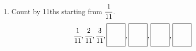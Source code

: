 \documentclass[12pt,letterpaper]{article}
\begin{document}
\begin{large}
\begin{enumerate}
\pagebreak

\item Count by 11ths starting from $\cfrac{1}{11}$.
\newcommand\answerbox{%
    \fbox{\rule{0.7cm}{0pt}\rule[-2ex]{0pt}{6ex}}}
\[
\cfrac{1}{11},\cfrac{2}{11},\cfrac{3}{11},\answerbox,\answerbox,\answerbox,\answerbox
\]
\end{enumerate}
\end{large}
\end{document}
